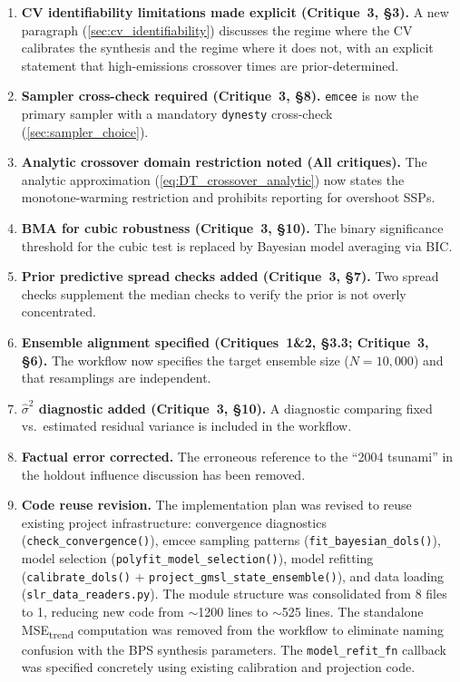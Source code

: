 \documentclass[11pt]{article}
\begin{document}
\begin{enumerate}
  \item \textbf{CV identifiability limitations made explicit (Critique~3, \S3).}  A new paragraph (\cref{sec:cv_identifiability}) discusses the regime where the CV calibrates the synthesis and the regime where it does not, with an explicit statement that high-emissions crossover times are prior-determined.

  \item \textbf{Sampler cross-check required (Critique~3, \S8).}  \texttt{emcee} is now the primary sampler with a mandatory \texttt{dynesty} cross-check (\cref{sec:sampler_choice}).

  \item \textbf{Analytic crossover domain restriction noted (All critiques).}  The analytic approximation (\cref{eq:DT_crossover_analytic}) now states the monotone-warming restriction and prohibits reporting for overshoot SSPs.

  \item \textbf{BMA for cubic robustness (Critique~3, \S10).}  The binary significance threshold for the cubic test is replaced by Bayesian model averaging via BIC.

  \item \textbf{Prior predictive spread checks added (Critique~3, \S7).}  Two spread checks supplement the median checks to verify the prior is not overly concentrated.

  \item \textbf{Ensemble alignment specified (Critiques~1\&2, \S3.3; Critique~3, \S6).}  The workflow now specifies the target ensemble size ($N = 10{,}000$) and that resamplings are independent.

  \item \textbf{$\hat{\sigma}^2$ diagnostic added (Critique~3, \S10).}  A diagnostic comparing fixed vs.\ estimated residual variance is included in the workflow.

  \item \textbf{Factual error corrected.}  The erroneous reference to the ``2004 tsunami'' in the holdout influence discussion has been removed.

  \item \textbf{Code reuse revision.}  The implementation plan was revised to reuse existing project infrastructure: convergence diagnostics (\texttt{check\_convergence()}), emcee sampling patterns (\texttt{fit\_bayesian\_dols()}), model selection (\texttt{polyfit\_model\_selection()}), model refitting (\texttt{calibrate\_dols()} + \texttt{project\_gmsl\_state\_ensemble()}), and data loading (\texttt{slr\_data\_readers.py}).  The module structure was consolidated from 8 files to 1, reducing new code from $\sim$1200 lines to $\sim$525 lines.  The standalone MSE\textsubscript{trend} computation was removed from the workflow to eliminate naming confusion with the BPS synthesis parameters.  The \texttt{model\_refit\_fn} callback was specified concretely using existing calibration and projection code.
\end{enumerate}
\end{document}
